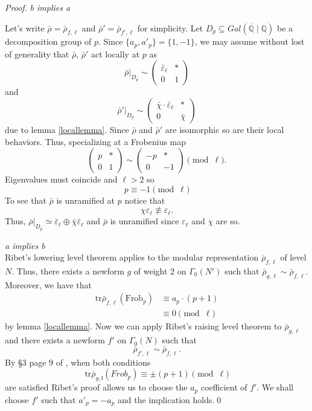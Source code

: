 \documentclass[12pt,reqno]{amsart}
\theoremstyle{plain}
\theoremstyle{definition}
\begin{document}
\begin{proof}
\emph{b implies a}

Let's write $\bar\rho = \bar\rho_{f,\ell}$ and $\bar{\rho}'=\bar\rho_{f',\ell}$ for simplicity. Let $D_p\subseteq Gal(\overline{\mathbb Q}\mid\mathbb Q)$ be a decomposition group of $p$. Since $\{a_p,a'_p\} = \{1, -1\}$, we may assume without lost of generality that  $\bar\rho$, $\bar\rho'$ act locally at $p$ as
$$
\bar\rho \vert_{D_p}\sim
\left(
\begin{array}{cc}
\bar\varepsilon_\ell  & *\\
0 		  &1
\end{array}
\right)
$$
and 
$$
\bar\rho' \vert_{D_p}\sim
\left(
\begin{array}{cc}
\bar\chi\cdot\bar\varepsilon_\ell  & *\\
0 		  &\bar\chi
\end{array}
\right)
$$
due to lemma \ref{locallemma}.
Since $\bar\rho$ and $\bar\rho'$ are isomorphic so are their local behaviors. Thus, specializing at  a Frobenius map
$$
\left(
\begin{array}{cc}
p  & *\\
0 		  &1
\end{array}
\right)
\sim
\left(
\begin{array}{cc}
-p  & *\\
0 		  &-1
\end{array}
\right)\pmod \ell.
$$
Eigenvalues must coincide and $\ell>2$ so
$$
p\equiv -1 \pmod \ell
$$
To see that $\bar\rho$ is unramified at $p$ notice that 
$$
\chi \varepsilon_\ell\not\equiv \varepsilon_\ell.
$$
Thus, $\bar\rho\vert_{D_p}\simeq \bar\varepsilon_\ell \oplus\bar\chi\bar\varepsilon_\ell$ and $\bar\rho$ is unramified since $\varepsilon_\ell$ and $\chi$ are so.

\emph{a implies b}\\
Ribet's lowering level theorem applies to the modular representation $\bar\rho_{f,\ell}$ of level $N$. Thus, there exists a newform $g$ of weight $2$ on $\Gamma_0(N')$ such that $\bar\rho_{g,\ell}\sim \bar\rho_{f,\ell}$. Moreover, we have that
\begin{align*}
\text{tr} \bar\rho_{f,\ell}(\text{Frob}_p)&\equiv a_p\cdot (p+1)\\
							&\equiv 0  \pmod \ell
\end{align*}
by lemma \ref{locallemma}.
Now we can apply Ribet's raising level theorem to $\bar\rho_{g,\ell}$ and there exists a newform $f'$ on $\Gamma_0(N)$ such that 
$$
\bar\rho_{f',\ell}\sim\bar\rho_{f,\ell}.
$$  
By \S $3$ page $9$ of \cite{RibetRai}, when both conditions 
$$
\text{tr}\bar \rho_{g,\mathfrak l} ( Frob_p )\equiv \pm (p+1) \pmod \ell
$$
are satisfied Ribet's proof allows us to choose the $a_p$ coefficient of $f'$. We shall choose $f'$ such that $a'_p = - a_p$ and the implication holds.\qed
\end{proof}
\end{document}
